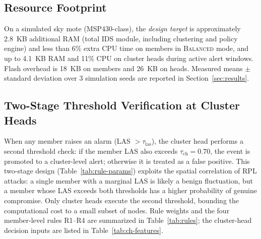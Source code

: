 \subsection{Resource Footprint}
On a simulated sky mote (MSP430-class), the \emph{design target} is approximately 2.8~KB additional RAM (total IDS module, including clustering and policy engine) and less than 6\% extra CPU time on members in \textsc{Balanced} mode, and up to 4.1~KB RAM and 11\% CPU on cluster heads during active alert windows.
Flash overhead is 18~KB on members and 26~KB on heads.
Measured means $\pm$ standard deviation over 3 simulation seeds are reported in Section~\ref{sec:results}.

\subsection{Two-Stage Threshold Verification at Cluster Heads}
When any member raises an alarm (LAS $> \tau_{\mathrm{las}}$), the cluster head performs a second threshold check: if the member LAS also exceeds $\tau_{\mathrm{ch}} = 0.70$, the event is promoted to a cluster-level alert; otherwise it is treated as a false positive.
This two-stage design (Table~\ref{tab:rule-params}) exploits the spatial correlation of RPL attacks: a single member with a marginal LAS is likely a benign fluctuation, but a member whose LAS exceeds both thresholds has a higher probability of genuine compromise.
Only cluster heads execute the second threshold, bounding the computational cost to a small subset of nodes.
Rule weights and the four member-level rules R1--R4 are summarized in Table~\ref{tab:rules}; the cluster-head decision inputs are listed in Table~\ref{tab:ch-features}.
